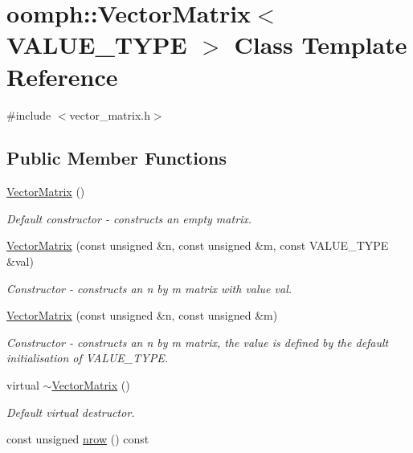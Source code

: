\hypertarget{classoomph_1_1VectorMatrix}{}\section{oomph\+:\+:Vector\+Matrix$<$ V\+A\+L\+U\+E\+\_\+\+T\+Y\+PE $>$ Class Template Reference}
\label{classoomph_1_1VectorMatrix}


{\ttfamily \#include $<$vector\+\_\+matrix.\+h$>$}

\subsection*{Public Member Functions}
\begin{DoxyCompactItemize}
\item 
\hyperlink{classoomph_1_1VectorMatrix_ab66eeed5c6d2f9a333890eaaf86def83}{Vector\+Matrix} ()
\begin{DoxyCompactList}\small\item\em Default constructor -\/ constructs an empty matrix. \end{DoxyCompactList}\item 
\hyperlink{classoomph_1_1VectorMatrix_a9e3f4fa81b91d802885c22a0595754c8}{Vector\+Matrix} (const unsigned \&n, const unsigned \&m, const V\+A\+L\+U\+E\+\_\+\+T\+Y\+PE \&val)
\begin{DoxyCompactList}\small\item\em Constructor -\/ constructs an n by m matrix with value val. \end{DoxyCompactList}\item 
\hyperlink{classoomph_1_1VectorMatrix_afb605d9b666be1184a9b39fddee6faec}{Vector\+Matrix} (const unsigned \&n, const unsigned \&m)
\begin{DoxyCompactList}\small\item\em Constructor -\/ constructs an n by m matrix, the value is defined by the default initialisation of V\+A\+L\+U\+E\+\_\+\+T\+Y\+PE. \end{DoxyCompactList}\item 
virtual \hyperlink{classoomph_1_1VectorMatrix_a61ef8bc51fd59119d84ce281d6dd82be}{$\sim$\+Vector\+Matrix} ()
\begin{DoxyCompactList}\small\item\em Default virtual destructor. \end{DoxyCompactList}\item 
const unsigned \hyperlink{classoomph_1_1VectorMatrix_a9beb051515fea3a264843aae9783e386}{nrow} () const

\end{DoxyCompactItemize}
